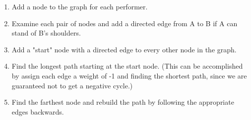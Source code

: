 \documentclass{article}
\begin{document}
\begin{enumerate}
\begin{enumerate}
\item Add a node to the graph for each performer.
\item Examine each pair of nodes and add a directed edge from A to
B if A can stand of B's shoulders.
\item Add a "start" node with a directed edge to every other node
in the graph.
\item Find the longest path starting at the start node. (This can
be accomplished by assign each edge a weight of -1 and finding the
shortest path, since we are guaranteed not to get a negative
cycle.)
\item Find the farthest node and rebuild the path by following the
appropriate edges backwards.
\end{enumerate}

\end{enumerate}
\end{document}
